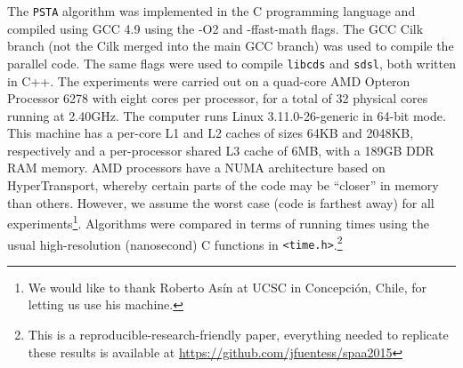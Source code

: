 The {\tt PSTA} algorithm was implemented in the C programming language
and compiled using GCC 4.9 using the -O2 and -ffast-math flags. The
GCC Cilk branch (not the Cilk merged into the main GCC branch) was
used to compile the parallel code. The same flags were used to compile
{\tt libcds} and {\tt sdsl}, both written in C++. The experiments were
carried out on a quad-core AMD Opteron\texttrademark{} Processor 6278
with eight cores per processor, for a total of 32 physical cores
running at 2.40GHz. The computer runs Linux 3.11.0-26-generic in
64-bit mode. This machine has a per-core L1 and L2 caches of sizes
64KB and 2048KB, respectively and a per-processor shared L3 cache of
6MB, with a 189GB DDR RAM memory. AMD processors have a NUMA
architecture based on HyperTransport, whereby certain parts of the
code may be ``closer'' in memory than others. However, we assume the
worst case (code is farthest away) for all experiments\footnote{We
would like to thank Roberto As\'in at UCSC in Concepci\'on, Chile, for
letting us use his machine.}. Algorithms were compared in terms of
running times using the usual high-resolution (nanosecond) C functions
in {\tt <time.h>}.\footnote{This is a reproducible-research-friendly
paper, everything needed to replicate these results is available at
\url{https://github.com/jfuentess/spaa2015}}